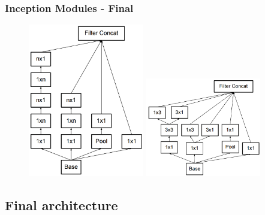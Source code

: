 \documentclass{beamer}
\begin{document}
\begin{frame}
	\frametitle{Inception Modules - Final}
	\begin{figure}
		\includegraphics[width=0.45\textwidth]{./figures/edit/breakdown_02.png}
		\hspace{0.05\textwidth} 
		\includegraphics[width=0.45\textwidth]{./figures/edit/breakdown_coarse.png}		
	\end{figure}
\end{frame}

\subsection{Final architecture}
\end{document}
